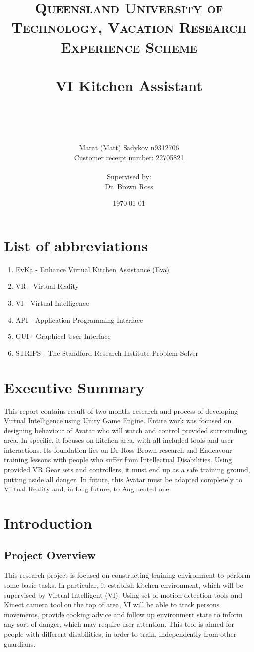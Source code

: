 \documentclass[18pt]{article}
\title{	
	\normalfont \normalsize 
	\textsc{Queensland University of Technology, Vacation Research Experience Scheme} \\ [25pt] 
	\horrule{0.5pt} \\[0.4cm] %
	\huge VI Kitchen Assistant \\ %
	\author{Marat (Matt) Sadykov \small n9312706 \\  Customer receipt number: \small 22705821 \\ \\ Supervised by: \\ Dr. Brown Ross \\ }
	\date{\normalsize\today} %
	\horrule{2pt} \\[0.5cm] %
}
\numberwithin{equation}{section} %
\numberwithin{figure}{section} %
\numberwithin{table}{section} %
\begin{document}
\maketitle
\newpage
\renewcommand*\contentsname{Table of Contents}
\tableofcontents
\listoffigures
\section{List of abbreviations}
	\begin{enumerate}
		\item EvKa - Enhance Virtual Kitchen Assistance (Eva) 
		\item VR - Virtual Reality 
		\item VI - Virtual Intelligence 
		\item API - Application Programming Interface 
		\item GUI - Graphical User Interface
		\item STRIPS - The Standford Research Institute Problem Solver  
	\end{enumerate}
	

\newpage	
\section{Executive Summary}
	This report contains result of two months research and process of developing Virtual Intelligence using Unity Game Engine. Entire work was focused on designing behaviour of Avatar who will watch and control provided surrounding area. In specific, it focuses on kitchen area, with all included tools and user interactions. Its foundation lies on Dr Ross Brown research and Endeavour training lessons with people who suffer from Intellectual Disabilities. Using provided VR Gear sets and controllers, it must end up as a safe training ground, putting aside all danger. In future, this Avatar must be adapted completely to Virtual Reality and, in long future, to Augmented one.
\section{Introduction}
	\subsection{Project Overview}
		This research project is focused on constructing training environment to perform some basic tasks. In particular, it establish kitchen environment, which will be supervised by Virtual Intelligent (VI). Using set of motion detection tools and Kinect camera tool on the top of area, VI will be able to track persons movements, provide cooking advice and follow up environment state to inform any sort of danger, which may require user attention. This tool is aimed for people with different disabilities, in order to train, independently from other guardians. \\
			
\end{document}
